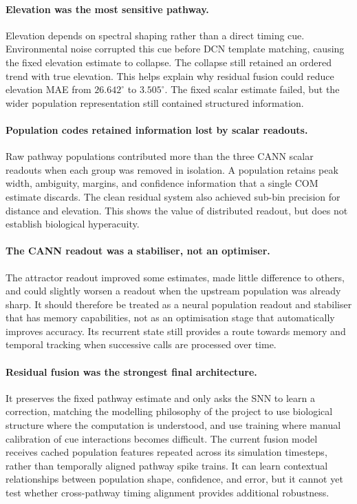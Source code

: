 \paragraph{Elevation was the most sensitive pathway.} Elevation depends on spectral shaping rather than a direct timing cue. Environmental noise corrupted this cue before DCN template matching, causing the fixed elevation estimate to collapse. The collapse still retained an ordered trend with true elevation. This helps explain why residual fusion could reduce elevation MAE from $26.642^\circ$ to $3.505^\circ$. The fixed scalar estimate failed, but the wider population representation still contained structured information.

\paragraph{Population codes retained information lost by scalar readouts.} Raw pathway populations contributed more than the three CANN scalar readouts when each group was removed in isolation. A population retains peak width, ambiguity, margins, and confidence information that a single COM estimate discards. The clean residual system also achieved sub-bin precision for distance and elevation. This shows the value of distributed readout, but does not establish biological hyperacuity.

\paragraph{The CANN readout was a stabiliser, not an optimiser.} The attractor readout improved some estimates, made little difference to others, and could slightly worsen a readout when the upstream population was already sharp. It should therefore be treated as a neural population readout and stabiliser that has memory capabilities, not as an optimisation stage that automatically improves accuracy. Its recurrent state still provides a route towards memory and temporal tracking when successive calls are processed over time.

\paragraph{Residual fusion was the strongest final architecture.} It preserves the fixed pathway estimate and only asks the SNN to learn a correction, matching the modelling philosophy of the project to use biological structure where the computation is understood, and use training where manual calibration of cue interactions becomes difficult. The current fusion model receives cached population features repeated across its simulation timesteps, rather than temporally aligned pathway spike trains. It can learn contextual relationships between population shape, confidence, and error, but it cannot yet test whether cross-pathway timing alignment provides additional robustness.

